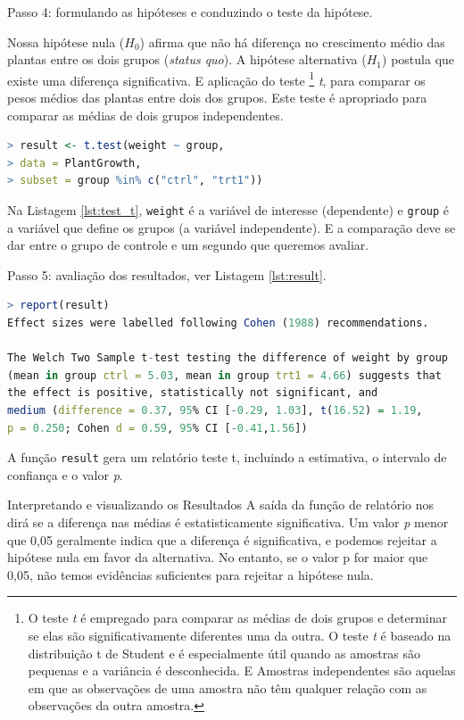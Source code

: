 \documentclass[article]{memoir}
\newcommand{\rlogo}{\protect\texttt{[image: figs/r\_logo.png]}}
\begin{document}
Passo 4: formulando as hipóteses e conduzindo o teste da hipótese.

Nossa hipótese nula ($H_0$) afirma que não há diferença no crescimento médio das plantas entre os dois grupos (\textit{status quo}). A hipótese alternativa ($H_1$) postula que existe uma diferença significativa. E aplicação do teste \footnote{O teste \textit{t} é empregado para comparar as médias de dois grupos e determinar se elas são significativamente diferentes uma da outra. O teste \textit{t} é baseado na distribuição t de Student e é especialmente útil quando as amostras são pequenas e a variância é desconhecida. E Amostras independentes são aquelas em que as observações de uma amostra não têm qualquer relação com as observações da outra amostra.} \textit{t}, para comparar os pesos médios das plantas entre dois dos grupos. Este teste é apropriado para comparar as médias de dois grupos independentes.

\begin{lstlisting}[language={R}, caption={aplicação do test \textit{t} para comparação do subgrupo (ctrl e trt1) no \rlogo.}, label={lst:test_t}]
> result <- t.test(weight ~ group, 
> data = PlantGrowth, 
> subset = group %in% c("ctrl", "trt1"))
\end{lstlisting}

Na Listagem \ref{lst:test_t}, \texttt{weight} é a variável de interesse (dependente) e \texttt{group} é a variável que define os grupos (a variável independente). E a comparação deve se dar entre o grupo de controle e um segundo que queremos avaliar.

Passo 5: avaliação dos resultados, ver Listagem \ref{lst:result}. 

\begin{lstlisting}[language={R}, caption={apresentação dos resultados.}, label={lst:result}]
> report(result)
Effect sizes were labelled following Cohen (1988) recommendations.

The Welch Two Sample t-test testing the difference of weight by group 
(mean in group ctrl = 5.03, mean in group trt1 = 4.66) suggests that 
the effect is positive, statistically not significant, and 
medium (difference = 0.37, 95% CI [-0.29, 1.03], t(16.52) = 1.19, 
p = 0.250; Cohen d = 0.59, 95% CI [-0.41,1.56])
\end{lstlisting}

A função \texttt{result} gera um relatório teste t, incluindo a estimativa, o intervalo de confiança e o valor \textit{p}.

Interpretando e visualizando os Resultados
A saída da função de relatório nos dirá se a diferença nas médias é estatisticamente significativa. Um valor \textit{p} menor que 0,05 geralmente indica que a diferença é significativa, e podemos rejeitar a hipótese nula em favor da alternativa. No entanto, se o valor p for maior que 0,05, não temos evidências suficientes para rejeitar a hipótese nula.
\end{document}
